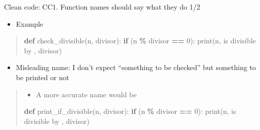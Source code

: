 \documentclass[
  8pt,
  ignorenonframetext,
]{beamer}
\newenvironment{Shaded}{\begin{snugshade}}{\end{snugshade}}
\newcommand{\BuiltInTok}[1]{#1}
\newcommand{\ControlFlowTok}[1]{\textcolor[rgb]{0.13,0.29,0.53}{\textbf{#1}}}
\newcommand{\DecValTok}[1]{\textcolor[rgb]{0.00,0.00,0.81}{#1}}
\newcommand{\KeywordTok}[1]{\textcolor[rgb]{0.13,0.29,0.53}{\textbf{#1}}}
\newcommand{\NormalTok}[1]{#1}
\newcommand{\OperatorTok}[1]{\textcolor[rgb]{0.81,0.36,0.00}{\textbf{#1}}}
\newcommand{\StringTok}[1]{\textcolor[rgb]{0.31,0.60,0.02}{#1}}
\providecommand{\tightlist}{%
  \setlength{\itemsep}{0pt}\setlength{\parskip}{0pt}}
\begin{document}
\begin{frame}[fragile]{Clean code: CC1. Function names should say what
they do 1/2}
\protect\hypertarget{clean-code-cc1.-function-names-should-say-what-they-do-12-1}{}
\begin{itemize}[<+->]
\tightlist
\item
  Example
\end{itemize}

\begin{quote}
\begin{Shaded}
\begin{Highlighting}[]
\KeywordTok{def}\NormalTok{ check\_divisible(n, divisor):}
  \ControlFlowTok{if}\NormalTok{ (n }\OperatorTok{\%}\NormalTok{ divisor }\OperatorTok{==} \DecValTok{0}\NormalTok{):}
    \BuiltInTok{print}\NormalTok{(n, }\StringTok{\textquotesingle{} is divisible by \textquotesingle{}}\NormalTok{, divisor)}
\end{Highlighting}
\end{Shaded}
\end{quote}

\begin{itemize}[<+->]
\tightlist
\item
  Misleading name: I don't expect ``something to be checked'' but
  something to be printed or not
\end{itemize}

\begin{quote}
\begin{itemize}
\tightlist
\item
  A more accurate name would be
\end{itemize}

\begin{Shaded}
\begin{Highlighting}[]
\KeywordTok{def}\NormalTok{ print\_if\_divisible(n, divisor):}
  \ControlFlowTok{if}\NormalTok{ (n }\OperatorTok{\%}\NormalTok{ divisor }\OperatorTok{==} \DecValTok{0}\NormalTok{):}
    \BuiltInTok{print}\NormalTok{(n, }\StringTok{\textquotesingle{} is divisible by \textquotesingle{}}\NormalTok{, divisor)}
\end{Highlighting}
\end{Shaded}
\end{quote}
\end{frame}
\end{document}
